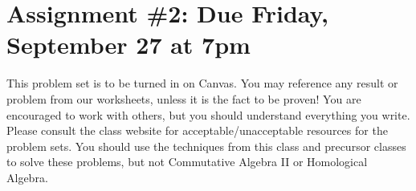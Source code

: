 \documentclass[12pt]{amsart}
\newcommand{\showsol}[1]{\def\displaysol{#1}}
\begin{document}
\showsol{1}
	
	\thispagestyle{empty}
	
	\section*{Assignment \#2: Due Friday, September 27 at 7pm}
	
	This problem set is to be turned in on Canvas. You may reference any result or problem from our worksheets, unless it is the fact to be proven! You are encouraged to work with others, but you should understand everything you write. Please consult the class website for acceptable/unacceptable resources for the problem sets. You should use the techniques from this class and precursor classes to solve these problems, but not Commutative Algebra II or Homological Algebra. 
	
	\
	
	
	
\end{document}

